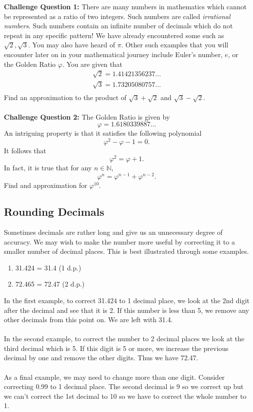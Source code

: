 \documentclass{article}
\begin{document}
\textbf{Challenge Question 1:} There are many numbers in mathematics which cannot be represented as a ratio of two integers. Such numbers are called \textit{irrational numbers}. Such numbers contain an infinite number of decimals which do not repeat in any specific pattern! We have already encountered some such as \(\sqrt{2}, \sqrt{3}\). You may also have heard of \(\pi\). Other such examples that you will encounter later on in your mathematical journey include Euler's number, \(e\), or the Golden Ratio \(\varphi\). You are given that
\begin{align*}
    \sqrt{2} = 1.41421356237... \\
    \sqrt{3} = 1.73205080757... \\
\end{align*}
Find an approximation to the product of \(\sqrt{3}+\sqrt{2}\) and \(\sqrt{3}-\sqrt{2}\).
\\
\\
\textbf{Challenge Question 2:}
The Golden Ratio is given by
\[
\varphi = 1.6180339887...
\]
An intriguing property is that it satisfies the following polynomial
\[
\varphi^2 -\varphi - 1 = 0.
\]
It follows that
\[
\varphi^2 = \varphi + 1.
\]
In fact, it is true that for any \(n\in\mathbb{N}\), 
\[
\varphi^n = \varphi^{n-1}+\varphi^{n-2}.
\]
Find and approximation for \(\varphi^{10}\).


\subsection{Rounding Decimals}

Sometimes decimals are rather long and give us an unnecessary degree of accuracy. We may wish to make the number more useful by correcting it to a smaller number of decimal places. This is best illustrated through some examples.

\begin{enumerate}
    \item 31.424 = 31.4 (1 d.p.)
    \item 72.465 = 72.47 (2 d.p.)
\end{enumerate}

In the first example, to correct 31.424 to 1 decimal place, we look at the 2nd digit after the decimal and see that it is 2. If this number is less than 5, we remove any other decimals from this point on. We are left with 31.4.
\\
\\
In the second example, to correct the number to 2 decimal places we look at the third decimal which is 5. If this digit is 5 or more, we increase the previous decimal by one and remove the other digits. Thus we have 72.47.
\\
\\
As a final example, we may need to change more than one digit. Consider correcting 0.99 to 1 decimal place. The second decimal is 9 so we correct up but we can't correct the 1st decimal to 10 so we have to correct the whole number to 1.
\end{document}
